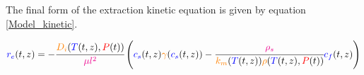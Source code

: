 \documentclass[../Article_Model_Parameters.tex]{subfiles}
\begin{document}
			
	The final form of the extraction kinetic equation is given by equation \ref{Model_kinetic}.
			
	{\scriptsize
		\begin{equation}
			\label{Model_kinetic}
				{\color{blue}r_e}(t,z) = -\cfrac{{\color{orange}D_i}({\color{blue}T}(t,z), {\color{red}P}(t))}{{\color{magenta} \mu l^2} } \left({\color{blue}{\color{blue} c_s} }(t,z) {\color{orange} \gamma}({\color{blue} c_s} (t,z)) - \cfrac{{\color{magenta}\rho_s}}{{\color{orange}k_m}({\color{blue}T}(t,z)){\color{orange}\rho}({\color{blue}T}(t,z),{\color{red}P}(t))}  {\color{blue}c_f}(t,z) \right)
		\end{equation} }
			
\end{document}
